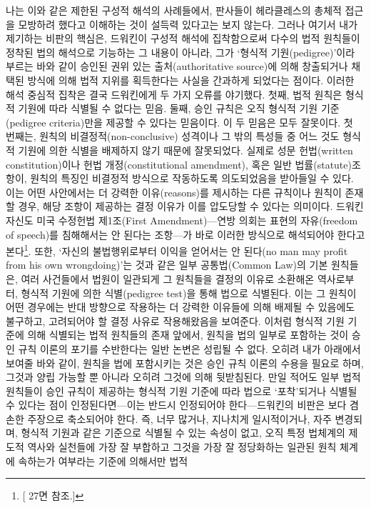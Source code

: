 나는 이와 같은 제한된 구성적 해석의 사례들에서, 판사들이 헤라클레스의
총체적 접근을 모방하려 했다고 이해하는 것이 설득력 있다고는 보지 않는다.
그러나 여기서 내가 제기하는 비판의 핵심은, 드워킨이 구성적 해석에
집착함으로써 다수의 법적 원칙들이 정착된 법의 해석으로 기능하는 그
내용이 아니라, 그가 `형식적 기원(pedigree)'이라 부르는 바와 같이 승인된
권위 있는 출처(authoritative source)에 의해 창출되거나 채택된 방식에
의해 법적 지위를 획득한다는 사실을 간과하게 되었다는 점이다. 이러한 해석
중심적 집착은 결국 드워킨에게 두 가지 오류를 야기했다. 첫째, 법적 원칙은
형식적 기원에 따라 식별될 수 없다는 믿음. 둘째, 승인 규칙은 오직 형식적
기원 기준(pedigree criteria)만을 제공할 수 있다는 믿음이다. 이 두 믿음은
모두 잘못이다. 첫 번째는, 원칙의 비결정적(non-conclusive) 성격이나 그
밖의 특성들 중 어느 것도 형식적 기원에 의한 식별을 배제하지 않기 때문에
잘못되었다. 실제로 성문 헌법(written constitution)이나 헌법
개정(constitutional amendment), 혹은 일반 법률(statute)조항이, 원칙의
특징인 비결정적 방식으로 작동하도록 의도되었음을 받아들일 수 있다. 이는
어떤 사안에서는 더 강력한 이유(reasons)를 제시하는 다른 규칙이나 원칙이
존재할 경우, 해당 조항이 제공하는 결정 이유가 이를 압도당할 수 있다는
의미이다. 드워킨 자신도 미국 수정헌법 제1조(First Amendment)---연방
의회는 표현의 자유(freedom of speech)를 침해해서는 안 된다는 조항---가
바로 이러한 방식으로 해석되어야 한다고 본다\footnote{{[} 27면
  참조.{]}}. 또한, `자신의 불법행위로부터 이익을 얻어서는 안 된다(no man
may profit from his own wrongdoing)'는 것과 같은 일부 공통법(Common
Law)의 기본 원칙들은, 여러 사건들에서 법원이 일관되게 그 원칙들을 결정의
이유로 소환해온 역사로부터, 형식적 기원에 의한 식별(pedigree test)을
통해 법으로 식별된다. 이는 그 원칙이 어떤 경우에는 반대 방향으로
작용하는 더 강력한 이유들에 의해 배제될 수 있음에도 불구하고, 고려되어야
할 결정 사유로 작용해왔음을 보여준다. 이처럼 형식적 기원 기준에 의해
식별되는 법적 원칙들의 존재 앞에서, 원칙을 법의 일부로 포함하는 것이
승인 규칙 이론의 포기를 수반한다는 일반 논변은 성립될 수 없다. 오히려
내가 아래에서 보여줄 바와 같이, 원칙을 법에 포함시키는 것은 승인 규칙
이론의 수용을 필요로 하며, 그것과 양립 가능할 뿐 아니라 오히려 그것에
의해 뒷받침된다. 만일 적어도 일부 법적 원칙들이 승인 규칙이 제공하는
형식적 기원 기준에 따라 법으로 `포착'되거나 식별될 수 있다는 점이
인정된다면---이는 반드시 인정되어야 한다---드워킨의 비판은 보다 겸손한
주장으로 축소되어야 한다. 즉, 너무 많거나, 지나치게 일시적이거나, 자주
변경되며, 형식적 기원과 같은 기준으로 식별될 수 있는 속성이 없고, 오직
특정 법체계의 제도적 역사와 실천들에 가장 잘 부합하고 그것을 가장 잘
정당화하는 일관된 원칙 체계에 속하는가 여부라는 기준에 의해서만 법적

